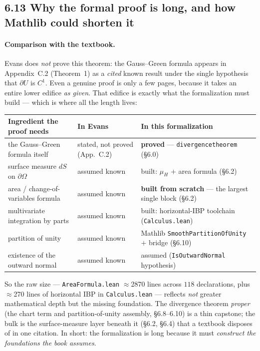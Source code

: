 ﻿\documentclass[12pt, a4paper]{article}
\renewcommand{\_}{\origunderscore\allowbreak}
\theoremstyle{definition}
\theoremstyle{plain}
\begin{document}
\subsection{6.13 Why the formal proof is long, and how Mathlib could shorten it}

\paragraph{Comparison with the textbook.}
Evans does \emph{not} prove this theorem: the Gauss--Green formula appears in Appendix~C.2
(Theorem~1) as a \emph{cited} known result under the single hypothesis that $\partial U$ is $C^1$.
Even a genuine proof is only a few pages, because it takes an entire lower edifice \emph{as given}.
That edifice is exactly what the formalization must build --- which is where all the length lives:

\begin{center}
\begin{tabular}{@{}L{4.6cm}L{3.2cm}L{6.4cm}@{}}
  \toprule
  \textbf{Ingredient the proof needs} & \textbf{In Evans} & \textbf{In this formalization} \\
  \midrule
  the Gauss--Green formula itself & stated, not proved (App.~C.2) & \textbf{proved} --- \texttt{divergence\_theorem} (\S6.0) \\
  surface measure $dS$ on $\partial\Omega$ & assumed known & built: $\mu_H$ $+$ area formula (\S6.2) \\
  area / change-of-variables formula & assumed known & \textbf{built from scratch} --- the largest single block (\S6.2) \\
  multivariate integration by parts & assumed known & built: horizontal-IBP toolchain (\texttt{Calculus.\allowbreak lean}) \\
  partition of unity & assumed known & Mathlib \texttt{SmoothPartitionOfUnity} $+$ bridge (\S6.10) \\
  existence of the outward normal & assumed known & assumed (\texttt{IsOutwardNormal} hypothesis) \\
  \bottomrule
\end{tabular}
\end{center}

\noindent So the raw size --- \texttt{AreaFormula.\allowbreak lean} $\approx$2870 lines across $118$
declarations, plus $\approx$270 lines of horizontal IBP in \texttt{Calculus.\allowbreak lean} ---
reflects \emph{not} greater mathematical depth but the missing foundation. The divergence theorem
\emph{proper} (the chart term and partition-of-unity assembly, \S6.8--6.10) is a thin capstone; the
bulk is the surface-measure layer beneath it (\S6.2, \S6.4) that a textbook disposes of in one
citation. In short: the formalization is long because it must \emph{construct the foundations the
book assumes}.
\end{document}
